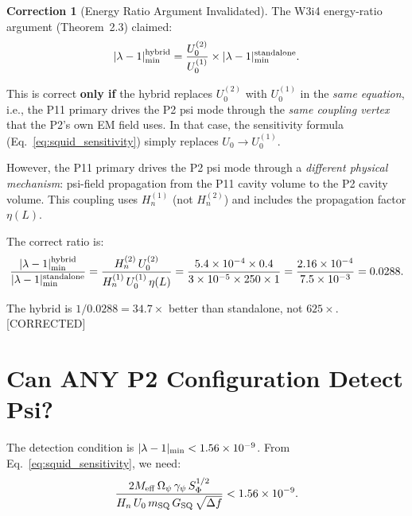 \documentclass[11pt,twocolumn]{article}
\newcommand{\lam}{\lambda}
\newcommand{\Opsi}{\Omega_\psi}
\newcommand{\gpsi}{\gamma_\psi}
\newcommand{\Meff}{M_{\rm eff}}
\newcommand{\ee}[1]{\times 10^{#1}}
\newcommand{\Heff}{H_n}
\newcommand{\Ucav}{U_0}
\theoremstyle{definition}
\newtheorem{correction}[theorem]{Correction}
\theoremstyle{remark}
\begin{document}
\begin{correction}[Energy Ratio Argument Invalidated]
\label{corr:energy_ratio}
The W3i4 energy-ratio argument (Theorem~2.3) claimed:
\begin{equation}
|\lam-1|_{\rm min}^{\rm hybrid}
= \frac{U_0^{(2)}}{U_0^{(1)}} \times |\lam-1|_{\rm min}^{\rm standalone}.
\label{eq:wrong_ratio}
\end{equation}

This is correct \textbf{only if} the hybrid replaces $U_0^{(2)}$ with
$U_0^{(1)}$ in the \emph{same equation}, i.e., the P11 primary drives
the P2 psi mode through the \emph{same coupling vertex} that the P2's
own EM field uses. In that case, the sensitivity formula
(Eq.~\ref{eq:squid_sensitivity}) simply replaces $\Ucav \to U_0^{(1)}$.

However, the P11 primary drives the P2 psi mode through a \emph{different
physical mechanism}: psi-field propagation from the P11 cavity volume to
the P2 cavity volume. This coupling uses $\Heff^{(1)}$ (not $\Heff^{(2)}$)
and includes the propagation factor $\eta(L)$.

The correct ratio is:
\begin{equation}
\frac{|\lam-1|_{\rm min}^{\rm hybrid}}{|\lam-1|_{\rm min}^{\rm standalone}}
= \frac{\Heff^{(2)}\,U_0^{(2)}}{\Heff^{(1)}\,U_0^{(1)}\,\eta(L)}
= \frac{5.4\ee{-4}\times 0.4}{3\ee{-5}\times 250\times 1}
= \frac{2.16\ee{-4}}{7.5\ee{-3}}
= 0.0288.
\label{eq:correct_ratio}
\end{equation}

The hybrid is $1/0.0288 = 34.7\times$ better than standalone, not
$625\times$. [CORRECTED]
\end{correction}

\section{Can ANY P2 Configuration Detect Psi?}
\label{sec:any_config}

The detection condition is $|\lam-1|_{\rm min} < 1.56\ee{-9}$.
From Eq.~\eqref{eq:squid_sensitivity}, we need:
\begin{equation}
\frac{2\Meff\,\Opsi\,\gpsi\,S_\Phi^{1/2}}
{\Heff\,\Ucav\,m_{\rm SQ}\,G_{\rm SQ}\,\sqrt{\Delta f}}
< 1.56\ee{-9}.
\label{eq:detection_condition}
\end{equation}
\end{document}
